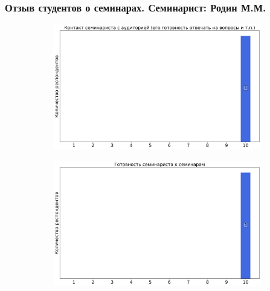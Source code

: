     \subsubsection{Отзыв студентов о семинарах. Семинарист: Родин М.М.}
        \begin{figure}[H]
            \centering
            \begin{subfigure}[b]{0.45\textwidth}
                \centering
                \includegraphics[width=\textwidth]{images/2 course/Дифференциальные уравнения/seminarists-marks-Родин М.М.-0.png}
            \end{subfigure}
            \begin{subfigure}[b]{0.45\textwidth}
                \centering
                \includegraphics[width=\textwidth]{images/2 course/Дифференциальные уравнения/seminarists-marks-Родин М.М.-1.png}
            \end{subfigure}
            \begin{subfigure}[b]{0.45\textwidth}
                \centering

\end{subfigure}
\end{figure}
